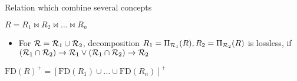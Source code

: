 \begin{itemize}
\begin{itemize}
                \begin{itemize}
                     Relation which combine several concepts
                \end{itemize}
             $R = R_1 \bowtie R_2 \bowtie \dots \bowtie R_n$
                \begin{itemize}
                    \item For $\mathcal{R} = \mathcal{R}_1 \cup \mathcal{R}_2$, decomposition $R_1 = \Pi_{\mathcal{R}_1}(R), R_2 = \Pi_{\mathcal{R}_2}(R)$ is lossless, if $(\mathcal{R}_1 \cap \mathcal{R}_2) \to \mathcal{R}_1 \vee (\mathcal{R}_1 \cap \mathcal{R}_2) \to \mathcal{R}_2$
                \end{itemize}
             $\text{FD}(R)^+ = [\text{FD}(R_1) \cup \dots \cup \text{FD}(R_n)]^+$
        \end{itemize}
\end{itemize}
